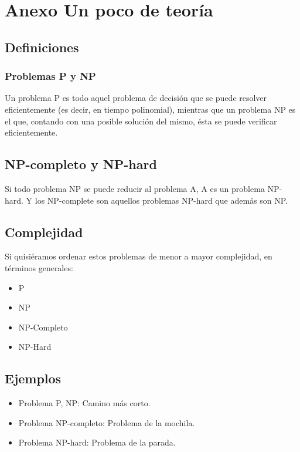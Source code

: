 \section{Anexo Un poco de teoría}
\subsection{Definiciones}
\subsubsection{Problemas P y NP}
Un problema P es todo aquel problema de decisión que se puede resolver eficientemente (es decir, en tiempo polinomial), mientras que un problema NP es el que, contando con una posible solución del mismo, ésta se puede verificar eficientemente.\\

\subsection{NP-completo y NP-hard}
Si todo problema NP se puede reducir al problema A, A es un problema NP-hard. Y los NP-complete son aquellos problemas NP-hard que además son NP.\\

\subsection{Complejidad}
Si quisiéramos ordenar estos problemas de menor a mayor complejidad, en términos generales: 
\begin{itemize}
    \item P
    \item NP
    \item NP-Completo
    \item NP-Hard
\end{itemize}

\subsection{Ejemplos}
\begin{itemize}
    \item Problema P, NP: Camino más corto.
    \item Problema NP-completo: Problema de la mochila.
    \item Problema NP-hard: Problema de la parada.
\end{itemize}


